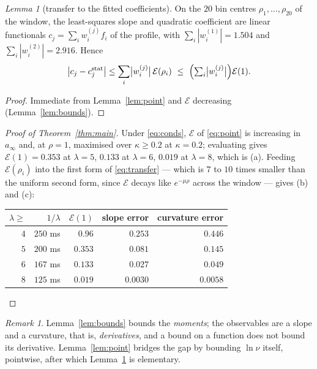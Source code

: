 \documentclass[11pt,a4paper]{article}
\theoremstyle{remark}\newtheorem{remark}[proposition]{Remark}
\newtheorem{lemma}{Lemma}[section]
\begin{document}
\begin{lemma}[transfer to the fitted coefficients]\label{lem:transfer}
On the $20$ bin centres $\rho_1,\dots,\rho_{20}$ of the window, the least-squares
slope and quadratic coefficient are linear functionals $c_j=\sum_i w^{(j)}_i f_i$ of
the profile, with $\sum_i|w^{(1)}_i|=1.504$ and $\sum_i|w^{(2)}_i|=2.916$. Hence
\begin{equation}
\bigl|c_j-c_j^{\mathrm{stat}}\bigr|\le\sum_i\bigl|w^{(j)}_i\bigr|\,\mathcal{E}(\rho_i)
\ \le\ \Bigl(\textstyle\sum_i\bigl|w^{(j)}_i\bigr|\Bigr)\mathcal{E}(1).
\label{eq:transfer}
\end{equation}
\end{lemma}
\begin{proof}
Immediate from Lemma~\ref{lem:point} and $\mathcal{E}$ decreasing
(Lemma~\ref{lem:bounds}).
\end{proof}

\begin{proof}[Proof of Theorem~\ref{thm:main}]
Under \eqref{eq:conds}, $\mathcal{E}$ of \eqref{eq:point} is increasing in $a_\infty$
and, at $\rho=1$, maximised over $\kappa\ge0.2$ at $\kappa=0.2$; evaluating gives
$\mathcal{E}(1)=0.353$ at $\lambda=5$, $0.133$ at $\lambda=6$, $0.019$ at $\lambda=8$,
which is (a). Feeding $\mathcal{E}(\rho_i)$ into the first form of
\eqref{eq:transfer} --- which is $7$ to $10$ times smaller than the uniform second
form, since $\mathcal{E}$ decays like $e^{-\mu\rho}$ across the window --- gives (b)
and (c):
\begin{center}
\begin{tabular}{rrrrr}
\toprule
$\lambda\ge$ & $1/\lambda$ & $\mathcal{E}(1)$ & slope error & curvature error\\
\midrule
$4$ & $250$ ms & $0.96$  & $0.253$  & $0.446$\\
$5$ & $200$ ms & $0.353$ & $0.081$  & $0.145$\\
$6$ & $167$ ms & $0.133$ & $0.027$  & $0.049$\\
$8$ & $125$ ms & $0.019$ & $0.0030$ & $0.0058$\\
\bottomrule
\end{tabular}
\end{center}
\end{proof}

\begin{remark}
Lemma~\ref{lem:bounds} bounds the \emph{moments}; the observables are a slope and a
curvature, that is, \emph{derivatives}, and a bound on a function does not bound its
derivative. Lemma~\ref{lem:point} bridges the gap by bounding $\ln\nu$ itself,
pointwise, after which Lemma~\ref{lem:transfer} is elementary.
\end{remark}
\end{document}
